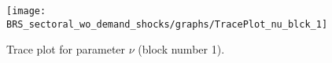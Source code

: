 \begin{figure}[H]
\centering
  \texttt{[image: BRS\_sectoral\_wo\_demand\_shocks/graphs/TracePlot\_nu\_blck\_1]}\\
    \caption{Trace plot for parameter $\nu$ (block number 1).}
\end{figure}
